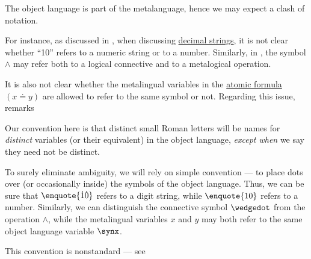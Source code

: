 \begin{remark}\label{rem:object_language_dots}
  The object language is part of the metalanguage, hence we may expect a clash of notation.

  For instance, as discussed in , when discussing \hyperref[def:positional_number_system/decimal]{decimal strings}, it is not clear whether \enquote{10} refers to a numeric string or to a number. Similarly, in , the symbol \( {\wedge} \) may refer both to a logical connective and to a metalogical operation.

  It is also not clear whether the metalingual variables in the \hyperref[def:first_order_syntax/atomic_formula]{atomic formula} \( (x \doteq y) \) are allowed to refer to the same symbol or not. Regarding this issue,  remarks
  \begin{displayquote}
    Our convention here is that distinct small Roman letters will be names for \textit{distinct} variables (or their equivalent) in the object language, \textit{except when} we say they need not be distinct.
  \end{displayquote}

  To surely eliminate ambiguity, we will rely on simple convention --- to place dots over (or occasionally inside) the symbols of the object language. Thus, we can be sure that \( \enquote{\syn1\syn0} \) refers to a digit string, while \( \enquote{10} \) refers to a number. Similarly, we can distinguish the connective symbol \( {\synwedge} \) from the operation \( {\wedge} \), while the metalingual variables \( x \) and \( y \) may both refer to the same object language variable \( \synx \).
\end{remark}
\begin{comments}
  \item This convention is nonstandard --- see 
\end{comments}

